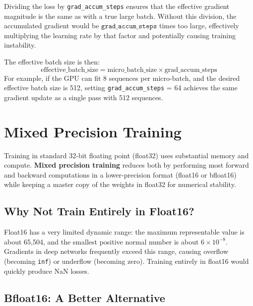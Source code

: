 \begin{keyconcept}
  Dividing the loss by \texttt{grad\_accum\_steps} ensures that the effective gradient magnitude is the same as with a true large batch. Without this division, the accumulated gradient would be $\texttt{grad\_accum\_steps}$ times too large, effectively multiplying the learning rate by that factor and potentially causing training instability.
\end{keyconcept}

The effective batch size is then:
\[
  \text{effective\_batch\_size} = \text{micro\_batch\_size} \times \text{grad\_accum\_steps}
\]
For example, if the GPU can fit 8 sequences per micro-batch, and the desired effective batch size is 512, setting \texttt{grad\_accum\_steps} = 64 achieves the same gradient update as a single pass with 512 sequences.

\section{Mixed Precision Training}

Training in standard 32-bit floating point (float32) uses substantial memory and compute. \textbf{Mixed precision training} reduces both by performing most forward and backward computations in a lower-precision format (float16 or bfloat16) while keeping a master copy of the weights in float32 for numerical stability.

\subsection{Why Not Train Entirely in Float16?}

Float16 has a very limited dynamic range: the maximum representable value is about 65,504, and the smallest positive normal number is about $6 \times 10^{-8}$. Gradients in deep networks frequently exceed this range, causing overflow (becoming \texttt{inf}) or underflow (becoming zero). Training entirely in float16 would quickly produce NaN losses.

\subsection{Bfloat16: A Better Alternative}

